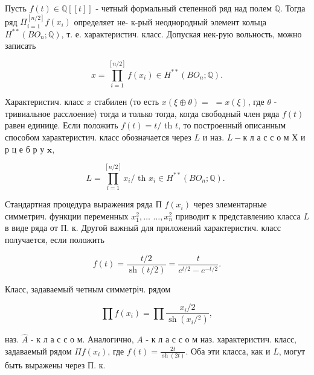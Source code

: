 \documentclass[10pt]{article}
\begin{document}
Пусть $f(t) \in \mathbb{Q}[[t]]$ - четный формальный степенной ряд над полем $\mathbb{Q}$. Тогда ряд $\Pi_{i=1}^{[n / 2]} f\left(x_{i}\right)$ определяет не- к-рый неоднородный элемент кольца $H^{* *}\left(B O_{n} ; \mathbb{Q}\right)$, т. е. характеристич. класс. Допуская нек-рую вольность, можно записать



\[

x=\prod_{i=1}^{[n / 2]} f\left(x_{i}\right) \in H^{* *}\left(B O_{n} ; \mathbb{Q}\right) .

\]



Характеристич. класс $x$ стабилен (то есть $x(\xi \oplus \theta)=$ $=x(\xi)$, где $\theta$ - тривиальное расслоение) тогда и только тогда, когда свободный член ряда $f(t)$ равен единице. Если положить $f(t)=t /$ th $t$, то построенный описанным способом характеристич. класс обозначается через $L$ и наз. $L-к$ л а с с о м Х и р ц е б р у $\mathbf{x}$,



\[

L=\prod_{l=1}^{[n / 2]} x_{i} / \text { th } x_{i} \in H^{* *}\left(B O_{n} ; \mathbb{Q}\right) \text {. }

\]



Стандартная процедура выражения ряда П $f\left(x_{i}\right)$ через элементарные симметрич. функции переменных $x_{1}^{2}, \ldots$ $\ldots, x_{n}^{2}$ приводит к представлению класса $L$ в виде ряда от П. к. Другой важный для приложений характеристич. класс получается, если положить



\[

f(t)=\frac{t / 2}{\operatorname{sh}(t / 2)}=\frac{t}{e^{t / 2}-e^{-t / 2}} .

\]



Класс, задаваемый четным симметріч. рядом



\[

\prod f\left(x_{i}\right)=\prod \frac{x_{i} / 2}{\operatorname{sh}\left(x_{i} /{ }^{2}\right)},

\]



наз. $\hat{A}$ - к л а с с о м. Аналогично, $A$ - к л а с с о м наз. характеристич. класс, задаваемый рядом $\Pi f\left(x_{i}\right)$, где $f(t)=\frac{2 t}{\operatorname{sh}(2 t)}$. Оба эти класса, как и $L$, могут быть выражены через П. к.
\end{document}
